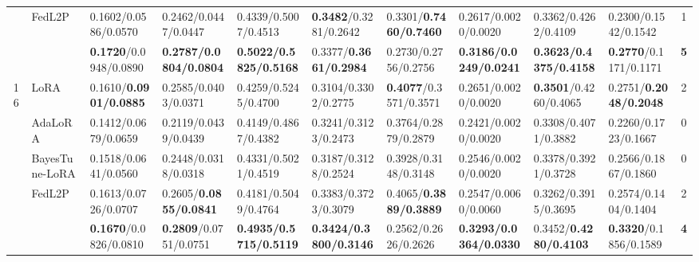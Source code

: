 \begin{table*}[t]
\begin{scriptsize}
{\begin{tabular}{c|l|l|l|l|l|l|l|l|l|c}
                    & FedL2P                               & 0.1602/0.0586/0.0570              & 0.2462/0.0447/0.0447             & 0.4339/0.5007/0.4513             & \textbf{0.3482}/0.3281/0.2642    & 0.3301/\textbf{0.7460/0.7460}               & 0.2617/0.0020/0.0020              & 0.3362/0.4262/0.4109             & 0.2300/0.1542/0.1542               & 1             \\ %
                    & \method{}                                 & \textbf{0.1720}/0.0948/0.0890      & \textbf{0.2787/0.0804/0.0804}    & \textbf{0.5022/0.5825/0.5168}    & 0.3377/\textbf{0.3661/0.2984}             & 0.2730/0.2756/0.2756              & \textbf{0.3186/0.0249/0.0241}    & \textbf{0.3623/0.4375/0.4158}    & \textbf{0.2770}/0.1171/0.1171     & \textbf{5}    \\ \hline
\multirow{5}{*}{16} & LoRA                                   & 0.1610/\textbf{0.0901/0.0885}              & 0.2585/0.0403/0.0371             & 0.4259/0.5245/0.4700               & 0.3104/0.3302/0.2775             & \textbf{0.4077}/0.3571/0.3571    & 0.2651/0.0020/0.0020               & \textbf{0.3501}/0.4260/0.4065     & 0.2751/\textbf{0.2048/0.2048}             & 2             \\ %
                    & AdaLoRA                              & 0.1412/0.0679/0.0659             & 0.2119/0.0439/0.0439             & 0.4149/0.4867/0.4382             & 0.3241/0.3123/0.2473             & 0.3764/0.2879/0.2879             & 0.2421/0.0020/0.0020               & 0.3308/0.4071/0.3882             & 0.2260/0.1723/0.1667              & 0             \\ %
                    & BayesTune-LoRA                            & 0.1518/0.0641/0.0560              & 0.2448/0.0318/0.0318             & 0.4331/0.5021/0.4519             & 0.3187/0.3128/0.2524             & 0.3928/0.3148/0.3148             & 0.2546/0.0020/0.0020               & 0.3378/0.3921/0.3728             & 0.2566/0.1867/0.1860              & 0             \\ %
                    & FedL2P                               & 0.1613/0.0726/0.0707             & 0.2605/\textbf{0.0855/0.0841}             & 0.4181/0.5049/0.4764             & 0.3383/0.3723/0.3079             & 0.4065/\textbf{0.3889/0.3889}             & 0.2547/0.0060/0.0060               & 0.3262/0.3915/0.3695             & 0.2574/0.1404/0.1404             & 2             \\ %
                    & \method{}                                 & \textbf{0.1670}/0.0826/0.0810      & \textbf{0.2809}/0.0751/0.0751    & \textbf{0.4935/0.5715/0.5119}    & \textbf{0.3424/0.3800/0.3146}      & 0.2562/0.2626/0.2626             & \textbf{0.3293/0.0364/0.0330}     & 0.3452/\textbf{0.4280/0.4103}              & \textbf{0.3320}/0.1856/0.1589     & \textbf{4}    \\ \bottomrule

\end{tabular}
}

\end{scriptsize}
\vspace{-1.2em}
\end{table*}